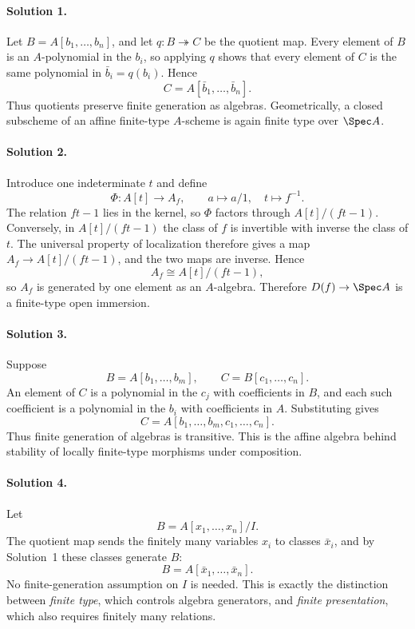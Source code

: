 
\paragraph{Solution 1.}
Let \(B=A[b_1,\ldots,b_n]\), and let \(q:B\twoheadrightarrow C\) be the quotient map.
Every element of \(B\) is an \(A\)-polynomial in the \(b_i\), so applying \(q\) shows that every
element of \(C\) is the same polynomial in \(\bar b_i=q(b_i)\).  Hence
\[
C=A[\bar b_1,\ldots,\bar b_n].
\]
Thus quotients preserve finite generation as algebras.  Geometrically, a closed subscheme of an
affine finite-type \(A\)-scheme is again finite type over \(\Spec A\).

\paragraph{Solution 2.}
Introduce one indeterminate \(t\) and define
\[
\Phi:A[t]\longrightarrow A_f,\qquad
a\longmapsto a/1,\quad t\longmapsto f^{-1}.
\]
The relation \(ft-1\) lies in the kernel, so \(\Phi\) factors through
\(A[t]/(ft-1)\).  Conversely, in \(A[t]/(ft-1)\) the class of \(f\) is invertible with inverse
the class of \(t\).  The universal property of localization therefore gives a map
\(A_f\to A[t]/(ft-1)\), and the two maps are inverse.  Hence
\[
A_f\cong A[t]/(ft-1),
\]
so \(A_f\) is generated by one element as an \(A\)-algebra.  Therefore
\(D(f)\to\Spec A\) is a finite-type open immersion.

\paragraph{Solution 3.}
Suppose
\[
B=A[b_1,\ldots,b_m],
\qquad
C=B[c_1,\ldots,c_n].
\]
An element of \(C\) is a polynomial in the \(c_j\) with coefficients in \(B\), and each such
coefficient is a polynomial in the \(b_i\) with coefficients in \(A\).  Substituting gives
\[
C=A[b_1,\ldots,b_m,c_1,\ldots,c_n].
\]
Thus finite generation of algebras is transitive.  This is the affine algebra behind stability of
locally finite-type morphisms under composition.

\paragraph{Solution 4.}
Let
\[
B=A[x_1,\ldots,x_n]/I.
\]
The quotient map sends the finitely many variables \(x_i\) to classes \(\bar x_i\), and by
Solution~1 these classes generate \(B\):
\[
B=A[\bar x_1,\ldots,\bar x_n].
\]
No finite-generation assumption on \(I\) is needed.  This is exactly the distinction between
\emph{finite type}, which controls algebra generators, and \emph{finite presentation}, which also
requires finitely many relations.

